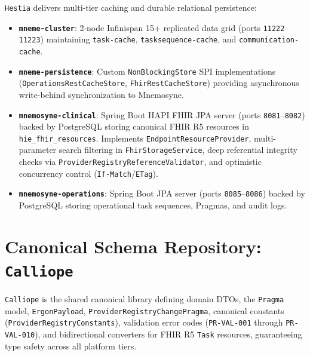 \texttt{Hestia} delivers multi-tier caching and durable relational persistence:
\begin{itemize}
    \item \textbf{\texttt{mneme-cluster}}: 2-node Infinispan 15+ replicated data grid (ports \texttt{11222}--\texttt{11223}) maintaining \texttt{task-cache}, \texttt{tasksequence-cache}, and \texttt{communication-cache}.
    \item \textbf{\texttt{mneme-persistence}}: Custom \texttt{NonBlockingStore} SPI implementations (\texttt{OperationsRestCacheStore}, \texttt{FhirRestCacheStore}) providing asynchronous write-behind synchronization to Mnemosyne.
    \item \textbf{\texttt{mnemosyne-clinical}}: Spring Boot HAPI FHIR JPA server (ports \texttt{8081}--\texttt{8082}) backed by PostgreSQL storing canonical FHIR R5 resources in \texttt{hie\_fhir\_resources}. Implements \texttt{EndpointResourceProvider}, multi-parameter search filtering in \texttt{FhirStorageService}, deep referential integrity checks via \texttt{ProviderRegistryReferenceValidator}, and optimistic concurrency control (\texttt{If-Match}/\texttt{ETag}).
    \item \textbf{\texttt{mnemosyne-operations}}: Spring Boot JPA server (ports \texttt{8085}--\texttt{8086}) backed by PostgreSQL storing operational task sequences, Pragmas, and audit logs.
\end{itemize}

\section{Canonical Schema Repository: \texttt{Calliope}}

\texttt{Calliope} is the shared canonical library defining domain DTOs, the \texttt{Pragma} model, \texttt{ErgonPayload}, \texttt{ProviderRegistryChangePragma}, canonical constants (\texttt{ProviderRegistryConstants}), validation error codes (\texttt{PR-VAL-001} through \texttt{PR-VAL-010}), and bidirectional converters for FHIR R5 \texttt{Task} resources, guaranteeing type safety across all platform tiers.

\newpage
